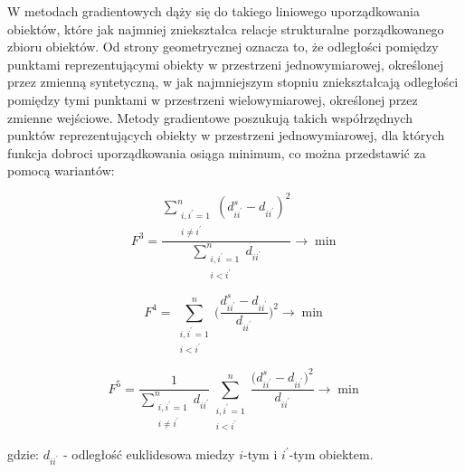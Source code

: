 \documentclass[12pt,a4paper]{report}
\begin{document}
W metodach gradientowych dąży się do takiego liniowego uporządkowania obiektów, które jak najmniej zniekształca relacje strukturalne porządkowanego zbioru obiektów. Od strony geometrycznej oznacza to, że odległości pomiędzy punktami reprezentującymi obiekty w przestrzeni jednowymiarowej, określonej przez zmienną syntetyczną, w jak najmniejszym stopniu zniekształcają odległości pomiędzy tymi punktami w przestrzeni wielowymiarowej, określonej przez zmienne wejściowe. Metody gradientowe poszukują takich współrzędnych punktów reprezentujących obiekty w przestrzeni jednowymiarowej, dla których funkcja dobroci uporządkowania osiąga minimum, co można przedstawić za pomocą wariantów:
 
\begin{equation}
F^{3}=\frac{\sum\limits_{\substack{i,i^{'}=1\\ i \neq i^{'}}}^n (d_{ii^{'}}^{s} - d_{ii^{'}})^2 }{\sum\limits_{\substack{i,i^{'}=1 \\ i<i^{'}}}^{n} d_{ii^{'}} } \rightarrow     \min  
\end{equation}

\begin{equation}
F^{4}=\sum_{\substack{i,i^{'}=1 \\ i<i^{'}}}^{n} \bigg( \frac{d_{ii^{'}}^{s} - d_{ii^{'}}}{d_{ii^{'}}} \bigg) ^2  \rightarrow     \min  
\end{equation}

\begin{equation}
F^{5}=\frac{1}{\sum\limits_ {\substack{i,i^{'}=1 \\ i\neq i^{'}}}^{n} d_{ii^{'}}} \sum_{\substack{i,i^{'}=1 \\ i<i^{'}}}^{n} \frac{\bigg(d_{ii^{'}}^{s} - d_{ii^{'}}\bigg)^2}{d_{ii^{'}}}\rightarrow     \min  
\end{equation}

gdzie:
\newline
$d_{ii^{'}}$ - odległość euklidesowa miedzy $i$-tym i $i^{'}$-tym obiektem.\\

\end{document}
